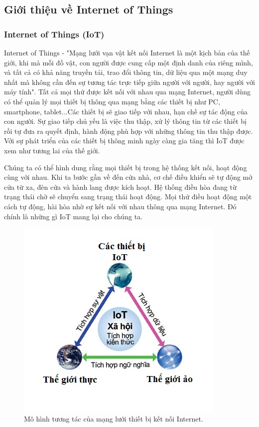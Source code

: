 \documentclass[a4paper,12pt,oneside]{article}
\begin{document}
\subsection{Giới thiệu về Internet of Things}

\subsubsection{Internet of Things (IoT)}

\noindent Internet of Things - "Mạng lưới vạn vật kết nối Internet là một kịch bản của thế giới, khi mà mỗi đồ vật, con người được cung cấp một định danh của riêng mình, và tất cả có khả năng truyền tải, trao đổi thông tin, dữ liệu qua một mạng duy nhất mà không cần đến sự tương tác trực tiếp giữa người với người, hay người với máy tính"\cite{iot}. Tất cả mọi thứ được kết nối với nhau qua mạng Internet, người dùng có thể quản lý mọi thiết bị thông qua mạng bằng các thiết bị như PC, smartphone, tablet...Các thiết bị sẽ giao tiếp với nhau, hạn chế sự tác động của con người. Sự giao tiếp chủ yếu là việc thu thập, xử lý thông tin từ các thiết bị rồi tự đưa ra quyết định, hành động phù hợp với những thông tin thu thập được. Với sự phát triển của các thiết bị thông minh ngày càng gia tăng thì IoT được xem như tương lai của thế giới.

\noindent Chúng ta có thể hình dung rằng mọi thiết bị trong hệ thống kết nối, hoạt động cùng với nhau. Khi ta bước gần về đến cửa nhà, cơ chế điều khiển sẽ tự động mở cửa từ xa, đèn cửa và hành lang được kích hoạt. Hệ thống điều hòa đang từ trạng thái chờ sẽ chuyển sang trạng thái hoạt động. Mọi thứ điều hoạt động một cách tự động, hài hòa nhờ sự kết nối với nhau thông qua mạng Internet. Đó chính là những gì IoT mang lại cho chúng ta.

\begin{figure}[H]
\centering
\includegraphics[scale=.7]{hinh/IoT_intro.jpg}
\caption{Mô hình tương tác của mạng lưới thiết bị kết nối Internet\cite{iot}.}
\end{figure}
\end{document}
